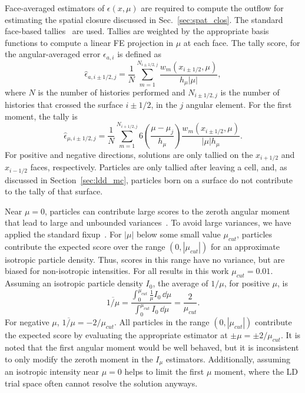 Face-averaged estimators of $\epsilon(x,\mu)$ are required to compute the outflow for
estimating the spatial closure discussed in Sec.~\ref{sec:spat_clos}. The standard face-based
tallies~\cite{shultis_mc,favorite_faces} are used.  Tallies are weighted by
the appropriate basis functions to compute a linear FE projection in $\mu$ at each face.  The
tally score, for the angular-averaged error $\epsilon_{a,i}$ is defined as
\begin{equation}
    \hat \epsilon_{a,i\pm1/2,j} = \frac{1}{N} \sum_{m=1}^{N_{i\pm1/2,j}}
    \frac{w_m(x_{i\pm1/2},\mu)}{h_{\mu} |\mu|},
\end{equation}
where $N$ is the number of histories performed and $N_{i\pm1/2,j}$ is the number of histories
that crossed the surface $i\pm1/2$, in the $j$ angular element.   For the first
moment, the tally is
\begin{equation}\label{eq:face_mutally}
    \hat \epsilon_{\mu,i\pm1/2,j} = \frac{1}{N} \sum_{m=1}^{N_{i+1/2,j}} 
    6\left(\frac{\mu-\mu_j}{h_\mu}\right) \frac{w_m(x_{i\pm1/2},\mu)}{|\mu| h_{\mu}}.
\end{equation}
For positive and negative directions, solutions are only tallied
on the $x_{i+1/2}$ and $x_{i-1/2}$ faces, respectively. Particles are only tallied after leaving
a cell, and, as discussed in Section~\ref{sec:ldd_mc}, particles born on a surface do not contribute
to the tally of that surface.

Near $\mu=0$, particles can contribute large scores to the zeroth angular moment that lead to large and
unbounded variances~\cite{favorite_faces}.  To avoid large variances, we have applied the standard fixup~\cite{mcnp,favorite_faces}.  
For $|\mu|$ below some small value $\mu_{cut}$, 
particles contribute the expected score over the range $(0,|\mu_{cut}|)$ for an
approximate isotropic particle density. Thus, scores in this range have no variance, but are biased
for non-isotropic intensities.  For all results in this work $\mu_{cut}=0.01$.  Assuming
an isotropic particle density $I_0$, the average of
$1/\mu$, for positive $\mu$, is
\begin{equation}
    \overline{1/\mu} = \frac{\displaystyle \int_0^{\mu_{cut}}\frac{1}{\mu} I_0 \,\dd
\mu}{\displaystyle \int_0^{\mu_{cut}} I_0\, \dd \mu} =
    \frac{2}{\mu_{cut}}.
\end{equation}
For negative $\mu$, $\overline{1/\mu}=-2/\mu_{cut}$.
All particles in the range $(0,|\mu_{cut}|)$ contribute the expected score by evaluating
the appropriate estimator at $\pm\mu = \pm2/\mu_{cut}$.  It is noted that the first angular moment would be well behaved, but it is inconsistent to only modify the zeroth 
moment in the $I_\mu$ estimators. Additionally, assuming an isotropic intensity near $\mu=0$ helps to limit
the first $\mu$ moment, where the LD trial space often cannot resolve the solution anyways.


